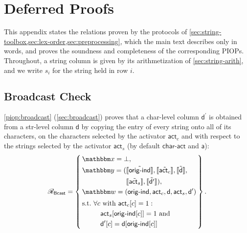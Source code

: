 \section{Deferred Proofs}
\label{sec:deferred-proofs}
This appendix states the relations proven by the protocols of \cref{sec:string-toolbox,sec:lex-order,sec:preprocessing}, which the main text describes only in words, and proves the soundness and completeness of the corresponding PIOPs. Throughout, a string column is given by its arithmetization of \cref{sec:string-arith}, and we write $s_i$ for the string held in row $i$.

\subsection{Broadcast Check}
\label{sec:proof-bcast}
\cref{piop:broadcast} (\cref{sec:broadcast}) proves that a char-level column $\mathsf{d}^\prime$ is obtained from a str-level column $\mathsf{d}$ by copying the entry of every string onto all of its characters, on the characters selected by the activator $\mathsf{act}_c$ and with respect to the strings selected by the activator $\mathsf{act}_s$ (by default $\mathsf{char\text{-}act}$ and $\mathsf{a}$):
\ifsp
\begin{displaymath}
\NPRelation_{\mathsf{Bcast}} = \left\{\,
  \begin{aligned}
    & \NPInstance = \bot,\\
    & \NPInstancey = (\Oracle{\MLE{\mathsf{orig\text{-}ind}}}, \Oracle{\MLE{\mathsf{act}_c}}, \Oracle{\MLE{\mathsf{d}}},\\
    & \phantom{\NPInstancey = (}\Oracle{\MLE{\mathsf{act}_s}}, \Oracle{\MLE{\mathsf{d}'}}),\\
    & \NPWitness = (\mathsf{orig\text{-}ind}, \mathsf{act}_c, \mathsf{d}, \mathsf{act}_s, \mathsf{d}')\\[2pt]
    & \text{s.t.}\ \forall c\ \text{with}\ \mathsf{act}_c[c] = 1:\\
    & \phantom{\text{s.t.}}\ \quad \mathsf{act}_s[\mathsf{orig\text{-}ind}[c]] = 1\ \text{and}\\
    & \phantom{\text{s.t.}}\ \quad \mathsf{d}'[c] = \mathsf{d}[\mathsf{orig\text{-}ind}[c]]
  \end{aligned}
\,\right\}.
\end{displaymath}
\else
